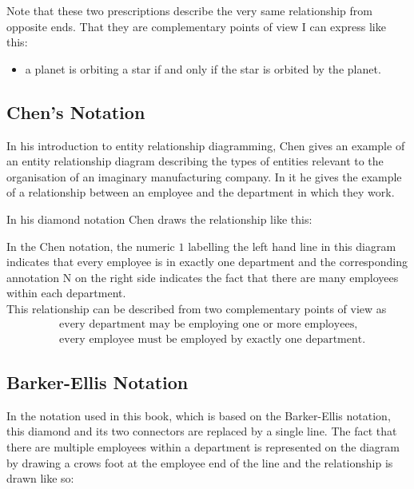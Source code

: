 Note that these two prescriptions describe the very same relationship from opposite ends. That they are complementary points of view I can express like this:

\begin{itemize}
\item a planet is orbiting a star if and only if the star is orbited by the planet.
\end{itemize}
\subsection*{Chen's Notation}
\mynote
In his introduction to entity relationship diagramming, Chen gives an example of an entity relationship diagram describing the types of entities relevant to the organisation of an imaginary manufacturing company.
In it he gives the example of a relationship between an employee and the department in which they work. 

\noindent In his diamond notation Chen draws the relationship like this:
\begin{center}
\scalebox{0.9}{}
\end{center}

\noindent In the Chen notation, the numeric $1$ labelling the left hand line in this diagram indicates that every employee is in exactly one department and the corresponding annotation N on the right side indicates the fact that there are many employees within each department. \\

\noindent This relationship can be described from  two complementary points of view as
\begin{align}
\label{employingText}&\mbox{every department may be employing one or more employees,} \\
\label{employedByText}&\mbox{every employee must be employed by exactly one department.}
\end{align}


\subsection*{Barker-Ellis Notation}
\noindent In the notation used in this book, which is based on the Barker-Ellis notation,  this diamond and its two connectors are replaced by a single line. The fact that there
are multiple employees within a department is represented on the diagram by drawing a crows foot at the employee end of the line and the relationship is drawn like so:

